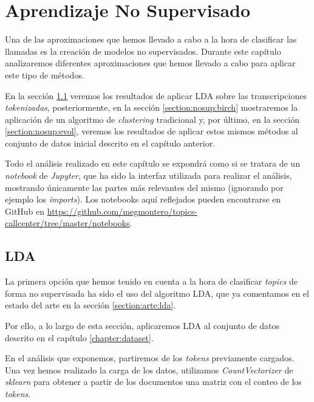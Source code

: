 \chapter{Aprendizaje No Supervisado}
\label{chapter:nosup}

Una de las aproximaciones que hemos llevado a cabo a la hora de clasificar las llamadas es la creación de modelos no supervisados. Durante este capítulo analizaremos diferentes aproximaciones que hemos llevado a cabo para aplicar este tipo de métodos. 

En la sección \ref{section:nosup:lda} veremos los resultados de aplicar LDA sobre las transcripciones \textit{tokenizadas}, posteriormente, en la sección \ref{section:nosup:birch} mostraremos la aplicación de un algoritmo de \textit{clustering} tradicional y, por último, en la sección \ref{section:nosup:evol}, veremos los resultados de aplicar estos mismos métodos al conjunto de datos inicial descrito en el capítulo anterior.


Todo el análisis realizado en este capítulo se expondrá como si se tratara de un \textit{notebook} de \textit{Jupyter}, que ha sido la interfaz utilizada para realizar el análisis, mostrando únicamente las partes más relevantes del mismo (ignorando por ejemplo los \textit{imports}). Los notebooks aquí reflejados pueden encontrarse en GitHub en  \href{https://github.com/megmontero/topics-callcenter/tree/master/notebooks}{https://github.com/megmontero/topics-callcenter/tree/master/notebooks}.


\section{LDA}
\label{section:nosup:lda}
La primera opción que hemos tenido en cuenta a la hora de clasificar \textit{topics} de forma no supervisada ha sido el uso del algoritmo LDA, que ya comentamos en el estado del arte en la sección \ref{section:arte:lda}.

Por ello, a lo largo de esta sección, aplicaremos LDA al conjunto de datos descrito en el capítulo \ref{chapter:dataset}. 


En el análisis que exponemos, partiremos de los \textit{tokens} previamente cargados. Una vez hemos realizado la carga de los datos, utilizamos \textit{CountVectorizer} de \textit{sklearn} para obtener a partir de los documentos una matriz con el conteo de los \textit{tokens}.

